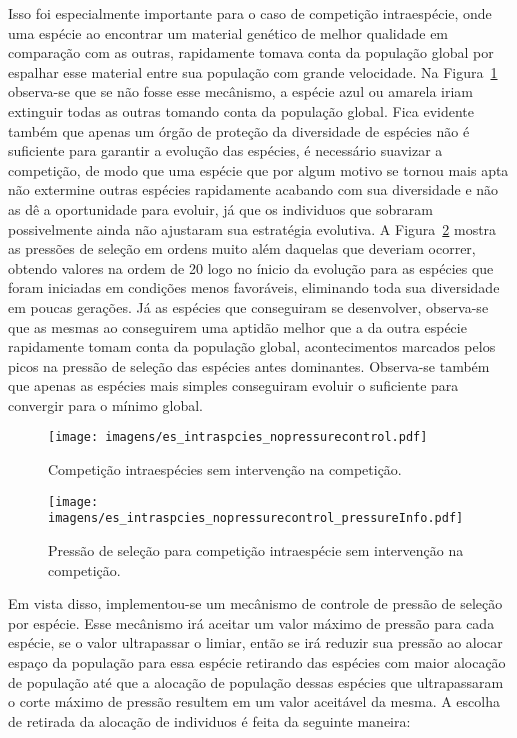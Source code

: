 Isso foi especialmente importante para o caso de competição
intraespécie, onde uma espécie ao encontrar um material genético de
melhor qualidade em comparação com as outras, rapidamente tomava conta
da população global por espalhar esse material entre sua população com
grande velocidade. Na Figura~\ref{fig:intraspecies_nopressure}
observa-se que se não fosse esse mecânismo, a espécie azul ou amarela
iriam extinguir todas as outras tomando conta da população
global. Fica evidente também que apenas um órgão de proteção da
diversidade de espécies não é suficiente para garantir a evolução das
espécies, é necessário suavizar a competição, de modo que uma espécie
que por algum motivo se tornou mais apta não extermine outras espécies
rapidamente acabando com sua diversidade e não as dê a oportunidade
para evoluir, já que os individuos que sobraram possivelmente ainda não
ajustaram sua estratégia evolutiva. A 
Figura~\ref{fig:intraspecies_nopressurecontrol_info} mostra as
pressões de seleção em ordens muito além daquelas que deveriam
ocorrer, obtendo valores na ordem de 20 logo no ínicio da evolução
para as espécies que foram iniciadas em condições menos favoráveis,
eliminando toda sua diversidade em poucas gerações. Já as espécies que
conseguiram se desenvolver, observa-se que as mesmas ao conseguirem
uma aptidão melhor que a da outra espécie rapidamente tomam conta da
população global, acontecimentos marcados pelos picos na pressão de
seleção das espécies antes dominantes. Observa-se também que apenas as
espécies mais simples conseguiram evoluir o suficiente para convergir
para o mínimo global.

\begin{figure}[h!t]
\centering
\texttt{[image: imagens/es\_intraspcies\_nopressurecontrol.pdf]}
\caption[Competição intraespécies sem intervenção na
competição.]{Competição intraespécies sem intervenção na competição.}
\label{fig:intraspecies_nopressure}
\end{figure}

\begin{figure}[h!t]
\centering
\texttt{[image: imagens/es\_intraspcies\_nopressurecontrol\_pressureInfo.pdf]}
\caption[Pressão de seleção para competição intraespécie sem
intervenção na competição.]{Pressão de seleção para competição
intraespécie sem intervenção na competição.}
\label{fig:intraspecies_nopressurecontrol_info}
\end{figure}

Em vista disso, implementou-se um mecânismo de controle de pressão de
seleção por espécie. Esse mecânismo irá aceitar um valor máximo de
pressão para cada espécie, se o valor ultrapassar o limiar, então se irá
reduzir sua pressão ao alocar espaço da população para essa espécie
retirando das espécies com maior alocação de população até que a
alocação de população dessas espécies que ultrapassaram o corte máximo
de pressão resultem em um valor aceitável da mesma. A escolha de
retirada da alocação de individuos é feita da seguinte maneira:

